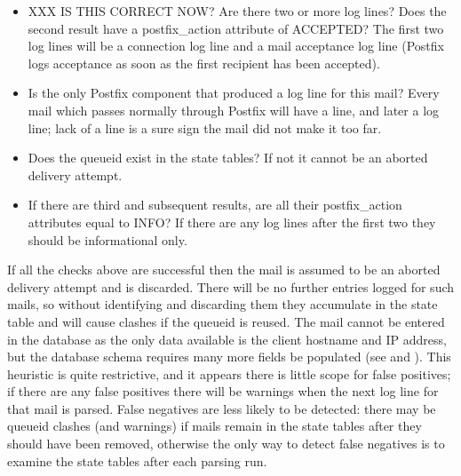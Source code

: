 \begin{itemize}

    \item XXX IS THIS CORRECT NOW\@?\newline{}  Are there two or more
         log lines?  Does the second result have a
        postfix\_action attribute of ACCEPTED\@?  The first two
         log lines will be a connection log line and a mail
        acceptance log line (Postfix logs acceptance as soon as the first
        recipient has been accepted).

    \item Is  the only Postfix component that produced a log
        line for this mail?  Every mail which passes normally through
        Postfix will have a  line, and later a
         log line; lack of a  line is a sure
        sign the mail did not make it too far.  

    \item Does the queueid exist in the state tables?  If not it cannot be
        an aborted delivery attempt.

    \item If there are third and subsequent results, are all their
        postfix\_action attributes equal to INFO\@?  If there are any log
        lines after the first two they should be informational only.

\end{itemize}

If all the checks above are successful then the mail is assumed to be an
aborted delivery attempt and is discarded.  There will be no further
entries logged for such mails, so without identifying and discarding them
they accumulate in the state table and will cause clashes if the queueid is
reused.  The mail cannot be entered in the database as the only data
available is the client hostname and \gls{IP} address, but the database
schema requires many more fields be populated (see  and ).  This heuristic is quite
restrictive, and it appears there is little scope for false positives; if
there are any false positives there will be warnings when the next log line
for that mail is parsed.  False negatives are less likely to be detected:
there may be queueid clashes (and warnings) if mails remain in the state
tables after they should have been removed, otherwise the only way to
detect false negatives is to examine the state tables after each parsing
run.

